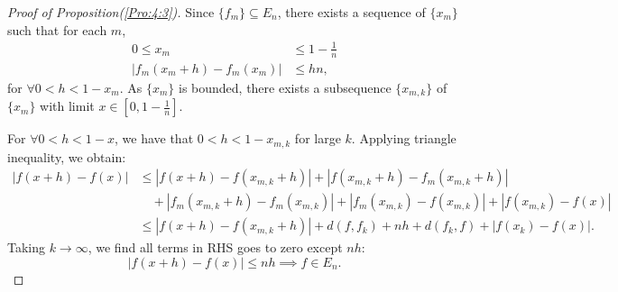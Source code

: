 \begin{proof}[Proof of Proposition(\ref{Pro:4:3})]
Since $\{f_m\}\subseteq E_n$, there exists a sequence of $\{x_m\}$ such that for each $m$,
\begin{align*}
0\le x_m&\le 1-\frac{1}{n}\\
|f_m(x_m+h) - f_m(x_m)|&\le hn,
\end{align*}
for $\forall 0<h<1-x_m$. As $\{x_m\}$ is bounded, there exists a subsequence $\{x_{m,k}\}$ of $\{x_m\}$ with limit $x\in[0,1-\frac{1}{n}]$.

For $\forall 0<h<1-x$, we have that $0<h<1-x_{m,k}$ for large $k$. Applying triangle inequality, we obtain:
\begin{align*}
|f(x+h) - f(x)|&\le|f(x+h) - f(x_{m,k} + h)| + |f(x_{m,k} + h)- f_m(x_{m,k}+h)|\\
&\quad +|f_m(x_{m,k}+h) - f_m(x_{m,k})|
+
|f_m(x_{m,k})- f(x_{m,k})|+
|f(x_{m,k}) - f(x)|\\
&\le 
|f(x+h) - f(x_{m,k} + h)|
+
d(f,f_k)+nh+d(f_k,f)+|f(x_k) - f(x)|.
\end{align*}
Taking $k\to\infty$, we find all terms in RHS goes to zero except $nh$:
\[
|f(x+h) - f(x)|\le nh\implies f\in E_n.
\]
\end{proof}
